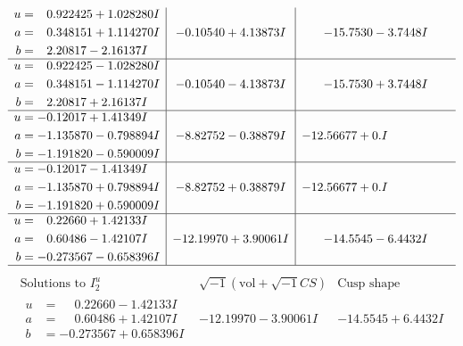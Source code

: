 \documentclass[1p]{elsarticle_modified}
\theoremstyle{definition}
\newcommand{\I}{\sqrt{-1}}
\begin{document}
$$\begin{array}{c|c|c}
\begin{aligned}
u &= \phantom{-}0.922425 + 1.028280 I \\
a &= \phantom{-}0.348151 + 1.114270 I \\
b &= \phantom{-}2.20817 - 2.16137 I\end{aligned}
 & -0.10540 + 4.13873 I & -15.7530 - 3.7448 I \\ \hline\begin{aligned}
u &= \phantom{-}0.922425 - 1.028280 I \\
a &= \phantom{-}0.348151 - 1.114270 I \\
b &= \phantom{-}2.20817 + 2.16137 I\end{aligned}
 & -0.10540 - 4.13873 I & -15.7530 + 3.7448 I \\ \hline\begin{aligned}
u &= -0.12017 + 1.41349 I \\
a &= -1.135870 - 0.798894 I \\
b &= -1.191820 - 0.590009 I\end{aligned}
 & -8.82752 - 0.38879 I & -12.56677 + 0. I\phantom{ +0.000000I} \\ \hline\begin{aligned}
u &= -0.12017 - 1.41349 I \\
a &= -1.135870 + 0.798894 I \\
b &= -1.191820 + 0.590009 I\end{aligned}
 & -8.82752 + 0.38879 I & -12.56677 + 0. I\phantom{ +0.000000I} \\ \hline\begin{aligned}
u &= \phantom{-}0.22660 + 1.42133 I \\
a &= \phantom{-}0.60486 - 1.42107 I \\
b &= -0.273567 - 0.658396 I\end{aligned}
 & -12.19970 + 3.90061 I & -14.5545 - 6.4432 I\\
 \hline 
 \end{array}$$\newpage$$\begin{array}{c|c|c}  
\text{Solutions to }I^u_{2}& \I (\text{vol} + \sqrt{-1}CS) & \text{Cusp shape}\\
 \hline 
\begin{aligned}
u &= \phantom{-}0.22660 - 1.42133 I \\
a &= \phantom{-}0.60486 + 1.42107 I \\
b &= -0.273567 + 0.658396 I\end{aligned}
 & -12.19970 - 3.90061 I & -14.5545 + 6.4432 I \\ \hline\begin{aligned}

\end{aligned}
\end{array}$$
\end{document}
